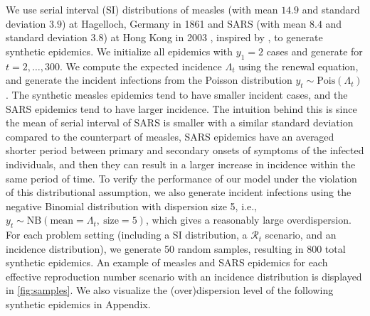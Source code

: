 \documentclass[10pt,letterpaper]{article}
\def\calR{\mathcal{R}}
\newcommand{\citep}[1]{\cite{#1}}
\begin{document}
We use serial interval (SI) distributions of measles (with mean $14.9$ and standard 
deviation $3.9$) at Hagelloch, Germany in 1861 \citep{groendyke2011bayesian} and 
SARS (with mean $8.4$ and standard deviation $3.8$) at Hong Kong in 2003 
\citep{cori2009temporal}, inspired by \cite{cori2013new}, to generate synthetic 
epidemics. We initialize all epidemics with $y_1=2$ cases and generate for $t=2,\ldots,300$. 
We compute the expected incidence $\Lambda_t$
using the renewal equation, and generate the incident infections from the
Poisson distribution $y_t\sim \textrm{Pois}(\Lambda_t)$. 
The synthetic measles epidemics tend to have smaller incident cases, and the SARS 
epidemics tend to have larger incidence. The intuition behind this is since the 
mean of serial interval of SARS is smaller with a similar standard deviation 
compared to the counterpart of measles, SARS epidemics have an averaged shorter period 
between primary and secondary onsets of symptoms of the infected individuals, and 
then they can result in a larger increase in incidence within the same period of time. 
To verify the
performance of our model under the violation of this distributional assumption,
we also generate incident infections using the negative Binomial distribution
with dispersion size 5, i.e., $y_t\sim \textrm{NB}(\textrm{mean}=\Lambda_t,\
\textrm{size}=5)$, which gives a reasonably large overdispersion. 
For each problem setting (including a SI distribution, a $\calR_t$ scenario, 
and an incidence distribution), we generate 50 random samples, resulting in 
$800$ total synthetic epidemics. 
An example of measles and SARS epidemics for each effective reproduction number scenario
with an incidence distribution is displayed in \autoref{fig:samples}. 
We also visualize the (over)dispersion level of the following synthetic epidemics in Appendix. 
\end{document}

